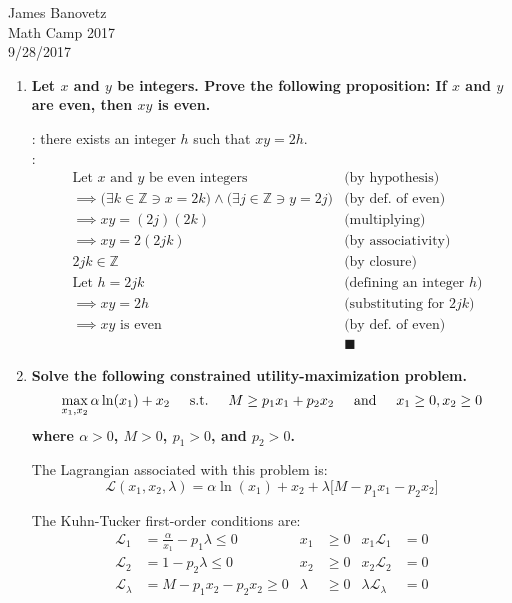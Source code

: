 \documentclass{article}
\begin{document}
James Banovetz\\
Math Camp 2017\\
9/28/2017

\begin{enumerate}
\item\textbf{Let $x$ and $y$ be integers. Prove the following proposition: If $x$ and $y$ are even,
	then $xy$ is even.}

	\underline{}: there exists an integer $h$ such that $xy=2h$.\\
	\underline{}:\\[-18pt]
	\begin{align*}
		&\text{Let $x$ and $y$ be even integers}
				&\text{(by hypothesis)}\\
		&\implies\Big(\exists k\in\mathbb{Z}\ni x=2k\Big)\wedge\Big(\exists j\in\mathbb{Z}\ni y=2j\Big)
				&\text{(by def. of even)}\\
		&\implies xy = (2j)(2k)																		
				&\text{(multiplying)}\\
		&\implies xy = 2(2jk)
				&\text{(by associativity)}\\
		&2jk\in\mathbb{Z}
				&\text{(by closure)}\\
		&\text{Let }h=2jk
				&\text{(defining an integer $h$)}\\
		&\implies xy = 2h
				&\text{(substituting for $2jk$)}\\
		&\implies xy\text{ is even}	
				&\text{(by def. of even)}\\
		&&\blacksquare
	\end{align*}



\item\textbf{Solve the following constrained utility-maximization problem.
		\[\max_{x_1,x_2}\alpha \ln(x_1) + x_2		\hspace{5mm} \text{s.t.} \hspace{5mm}
			M \geq p_1x_1 + p_2x_2		\hspace{5mm} \text{and} \hspace{5mm}
			x_1 \geq 0, x_2 \geq 0
		\]
	where $\alpha>0$, $M>0$, $p_1>0$, and $p_2>0$.}

	The Lagrangian associated with this problem is:
		\[\mathcal{L}(x_1,x_2,\lambda)=\alpha\ln(x_1)+x_2+\lambda\big[M-p_1x_1-p_2x_2\big]\]

	The Kuhn-Tucker first-order conditions are:
	\begin{align*}
		\mathcal{L}_1 & = \frac{\alpha}{x_1} - p_1\lambda \leq 0
			&x_1 & \geq 0
			&x_1\mathcal{L}_1 & = 0
				\\
		\mathcal{L}_2 & = 1 -p_2\lambda \leq 0						
			&x_2 & \geq 0
			&x_2\mathcal{L}_2 & = 0
				\\[5pt]
		\mathcal{L}_\lambda & = M - p_1x_2 - p_2x_2 \geq 0
			&\lambda & \geq 0
			&\lambda\mathcal{L}_\lambda & = 0
	\end{align*}


\end{enumerate}
\end{document}
